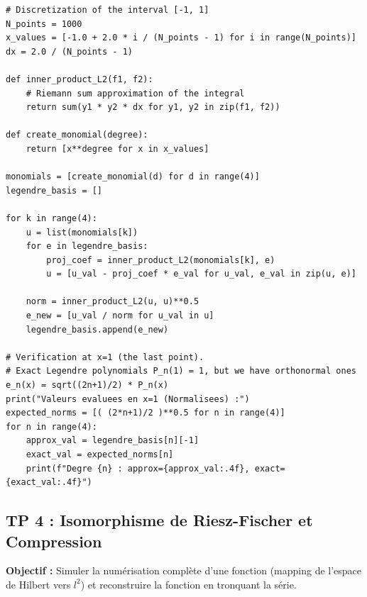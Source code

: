 \documentclass[11pt,a4paper]{article}
\begin{document}
\begin{lstlisting}
# Discretization of the interval [-1, 1]
N_points = 1000
x_values = [-1.0 + 2.0 * i / (N_points - 1) for i in range(N_points)]
dx = 2.0 / (N_points - 1)

def inner_product_L2(f1, f2):
    # Riemann sum approximation of the integral
    return sum(y1 * y2 * dx for y1, y2 in zip(f1, f2))

def create_monomial(degree):
    return [x**degree for x in x_values]

monomials = [create_monomial(d) for d in range(4)]
legendre_basis = []

for k in range(4):
    u = list(monomials[k])
    for e in legendre_basis:
        proj_coef = inner_product_L2(monomials[k], e)
        u = [u_val - proj_coef * e_val for u_val, e_val in zip(u, e)]

    norm = inner_product_L2(u, u)**0.5
    e_new = [u_val / norm for u_val in u]
    legendre_basis.append(e_new)

# Verification at x=1 (the last point).
# Exact Legendre polynomials P_n(1) = 1, but we have orthonormal ones e_n(x) = sqrt((2n+1)/2) * P_n(x)
print("Valeurs evaluees en x=1 (Normalisees) :")
expected_norms = [( (2*n+1)/2 )**0.5 for n in range(4)]
for n in range(4):
    approx_val = legendre_basis[n][-1]
    exact_val = expected_norms[n]
    print(f"Degre {n} : approx={approx_val:.4f}, exact={exact_val:.4f}")
\end{lstlisting}


\subsection*{TP 4 : Isomorphisme de Riesz-Fischer et Compression}

\textbf{Objectif :} Simuler la numérisation complète d'une fonction (mapping de l'espace de Hilbert vers $l^2$) et reconstruire la fonction en tronquant la série.
\end{document}
